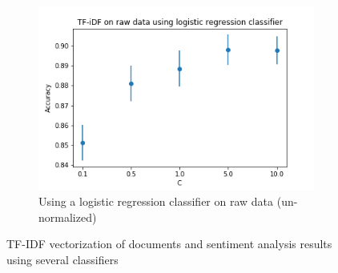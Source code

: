 \documentclass{article}
\begin{document}
\begin{figure}
        
        \begin{subfigure}[b]{0.7\textwidth}
            \includegraphics[width=\textwidth]{tf-idf-raw-lr.png}
            \caption{Using a logistic regression classifier on raw data (un-normalized)}
            \label{fig:tf-idf-lr-raw}
        \end{subfigure}
        
        \caption{TF-IDF vectorization of documents and sentiment analysis results using several classifiers}\label{fig:tf-idf}
    \end{figure}
    
\end{document}
